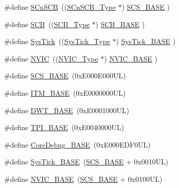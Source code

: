 \begin{DoxyCompactItemize}
\item 
\#define \hyperlink{group___c_m_s_i_s__core__base_ga9fe0cd2eef83a8adad94490d9ecca63f}{S\-Cn\-S\-C\-B}~((\hyperlink{struct_s_cn_s_c_b___type}{S\-Cn\-S\-C\-B\-\_\-\-Type}    $\ast$)     \hyperlink{group___c_m_s_i_s__core__base_ga3c14ed93192c8d9143322bbf77ebf770}{S\-C\-S\-\_\-\-B\-A\-S\-E}      )
\item 
\#define \hyperlink{group___c_m_s_i_s__core__base_gaaaf6477c2bde2f00f99e3c2fd1060b01}{S\-C\-B}~((\hyperlink{struct_s_c_b___type}{S\-C\-B\-\_\-\-Type}       $\ast$)     \hyperlink{group___c_m_s_i_s__core__base_gad55a7ddb8d4b2398b0c1cfec76c0d9fd}{S\-C\-B\-\_\-\-B\-A\-S\-E}      )
\item 
\#define \hyperlink{group___c_m_s_i_s__core__base_gacd96c53beeaff8f603fcda425eb295de}{Sys\-Tick}~((\hyperlink{struct_sys_tick___type}{Sys\-Tick\-\_\-\-Type}   $\ast$)     \hyperlink{group___c_m_s_i_s__core__base_ga58effaac0b93006b756d33209e814646}{Sys\-Tick\-\_\-\-B\-A\-S\-E}  )
\item 
\#define \hyperlink{group___c_m_s_i_s__core__base_gac8e97e8ce56ae9f57da1363a937f8a17}{N\-V\-I\-C}~((\hyperlink{struct_n_v_i_c___type}{N\-V\-I\-C\-\_\-\-Type}      $\ast$)     \hyperlink{group___c_m_s_i_s__core__base_gaa0288691785a5f868238e0468b39523d}{N\-V\-I\-C\-\_\-\-B\-A\-S\-E}     )
\item 
\#define \hyperlink{group___c_m_s_i_s__core__base_ga3c14ed93192c8d9143322bbf77ebf770}{S\-C\-S\-\_\-\-B\-A\-S\-E}~(0x\-E000\-E000\-U\-L)
\item 
\#define \hyperlink{group___c_m_s_i_s__core__base_gadd76251e412a195ec0a8f47227a8359e}{I\-T\-M\-\_\-\-B\-A\-S\-E}~(0x\-E0000000\-U\-L)
\item 
\#define \hyperlink{group___c_m_s_i_s__core__base_gafdab534f961bf8935eb456cb7700dcd2}{D\-W\-T\-\_\-\-B\-A\-S\-E}~(0x\-E0001000\-U\-L)
\item 
\#define \hyperlink{group___c_m_s_i_s__core__base_ga2b1eeff850a7e418844ca847145a1a68}{T\-P\-I\-\_\-\-B\-A\-S\-E}~(0x\-E0040000\-U\-L)
\item 
\#define \hyperlink{group___c_m_s_i_s__core__base_ga680604dbcda9e9b31a1639fcffe5230b}{Core\-Debug\-\_\-\-B\-A\-S\-E}~(0x\-E000\-E\-D\-F0\-U\-L)
\item 
\#define \hyperlink{group___c_m_s_i_s__core__base_ga58effaac0b93006b756d33209e814646}{Sys\-Tick\-\_\-\-B\-A\-S\-E}~(\hyperlink{group___c_m_s_i_s__core__base_ga3c14ed93192c8d9143322bbf77ebf770}{S\-C\-S\-\_\-\-B\-A\-S\-E} +  0x0010\-U\-L)
\item 
\#define \hyperlink{group___c_m_s_i_s__core__base_gaa0288691785a5f868238e0468b39523d}{N\-V\-I\-C\-\_\-\-B\-A\-S\-E}~(\hyperlink{group___c_m_s_i_s__core__base_ga3c14ed93192c8d9143322bbf77ebf770}{S\-C\-S\-\_\-\-B\-A\-S\-E} +  0x0100\-U\-L)

\end{DoxyCompactItemize}
